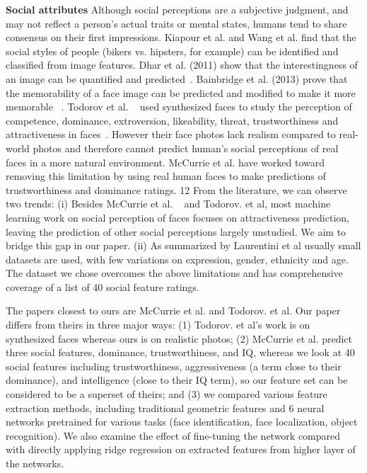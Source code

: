 \documentclass[10pt,twocolumn,letterpaper]{article}
\begin{document}
\textbf{Social attributes}
Although social perceptions are a subjective judgment, and may not reflect a person's actual traits or mental states, humans tend to share consensus on their first impressions. Kiapour et al.\cite{kiapour2014hipster} and Wang et al.\cite{wang2015bikers} find that the social styles of people (bikers vs. hipsters, for example) can be identified and classified from image features. Dhar et al. (2011) show that the interestingness of an image can be quantified and predicted~\cite{dhar2011high}. Bainbridge et al. (2013) prove that the memorability of a face image can be predicted and modified to make it more memorable
~\cite{bainbridge2013intrinsic}. Todorov et al. ~\cite{todorov2013validation, todorov2013social,todorov2015social} used synthesized faces to study the perception of competence, dominance, extroversion, likeability, threat, trustworthiness and attractiveness in faces~\cite{todorov2008evaluating}. However their face photos lack realism compared to real-world photos and therefore cannot predict human's social perceptions of real faces in a more natural environment. McCurrie et al. \cite{mccurrie2016predicting} have worked toward removing this limitation by using real human faces to make predictions of trustworthiness and dominance ratings. 
12
From the literature, we can observe two trends: (i) Besides McCurrie et al. ~\cite{mccurrie2016predicting} and Todorov. et al\cite{todorov2008evaluating}, most machine learning work on social perception of faces focuses on attractiveness prediction, leaving the prediction of other social perceptions largely unstudied. We aim to bridge this gap in our paper. (ii) As summarized by Laurentini et al\cite{laurentini2014computer} usually small datasets are used, with few variations on expression, gender, ethnicity and age. The dataset we chose overcomes the above limitations and has comprehensive coverage of a list of 40 social feature ratings. 

The papers closest to ours are McCurrie et al. \cite{mccurrie2016predicting} and Todorov. et al\cite{todorov2008evaluating}. Our paper differs from theirs in three major ways: (1) Todorov. et al's work is on synthesized faces whereas ours is on realistic photos; (2) McCurrie et al. \cite{mccurrie2016predicting} predict three social features, dominance, trustworthiness, and IQ, whereas we look at 40 social features including trustworthiness, aggressiveness (a term close to their dominance), and intelligence (close to their IQ term), so our feature set can be considered to be a superset of theirs; and (3) we compared various feature extraction methods, including traditional geometric features and 6 neural networks pretrained for various tasks (face identification, face localization, object recognition). We also examine the effect of fine-tuning the network compared with directly applying ridge regression on extracted features from higher layer of the networks. 
\end{document}
